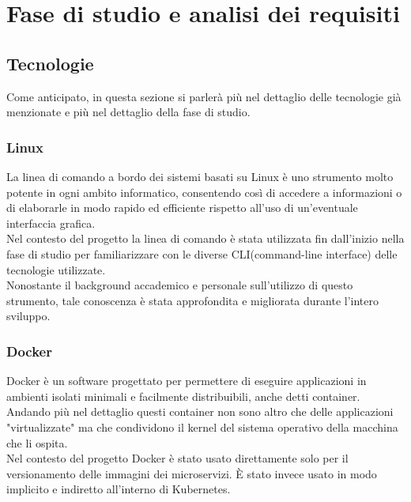 \documentclass[a4paper,12pt]{report}
\begin{document}

\chapter{Fase di studio e analisi dei requisiti}
\section{Tecnologie}
Come anticipato, in questa sezione si parlerà più nel dettaglio delle tecnologie già menzionate e più nel dettaglio della fase di studio.
\subsection{Linux}
La linea di comando a bordo dei sistemi basati su Linux è uno strumento molto potente in ogni ambito informatico, consentendo così di accedere a informazioni o di elaborarle in modo rapido ed efficiente rispetto all'uso di un'eventuale interfaccia grafica.\\
Nel contesto del progetto la linea di comando è stata utilizzata fin dall'inizio nella fase di studio per familiarizzare con le diverse CLI(command-line interface) delle tecnologie utilizzate. \\
Nonostante il background accademico e personale sull'utilizzo di questo strumento, tale conoscenza è stata approfondita e migliorata durante l'intero sviluppo.\\
\subsection{Docker}
Docker è un software progettato per permettere di eseguire applicazioni in ambienti isolati minimali e facilmente distribuibili, anche detti container. \cite{docker} \\
Andando più nel dettaglio questi container non sono altro che delle applicazioni "virtualizzate" ma che condividono il kernel del sistema operativo della macchina che li ospita. \\
Nel contesto del progetto Docker è stato usato direttamente solo per il versionamento delle immagini dei microservizi. È stato invece usato in modo implicito e indiretto all'interno di Kubernetes.
\end{document}

